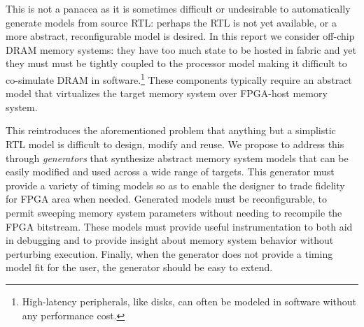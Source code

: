 This is not a panacea as it is sometimes difficult or undesirable to
automatically generate models from source RTL: perhaps the RTL is not yet
available, or a more abstract, reconfigurable model is desired. In this report
we consider off-chip DRAM memory systems: they have too much state to be hosted
in fabric and yet they must must be tightly coupled to the processor model
making it difficult to co-simulate DRAM in software.\footnote{High-latency
peripherals, like disks, can often be modeled in software without any
performance cost.\cite{disksim}} These components typically require an abstract
model that virtualizes the target memory system over FPGA-host memory system.

This reintroduces the aforementioned problem that anything but a simplistic RTL
model is difficult to design, modify and reuse. We propose to address this
through \emph{generators} that synthesize abstract memory system models that
can be easily modified and used across a wide range of targets.  This generator
must provide a variety of timing models so as to enable the designer to trade
fidelity for FPGA area when needed. Generated models must be reconfigurable, to
permit sweeping memory system parameters without needing to recompile the FPGA
bitstream. These models must provide useful instrumentation to both aid in
debugging and to provide insight about memory system behavior without
perturbing execution. Finally, when the generator does not provide a timing
model fit for the user, the generator should be easy to extend.
